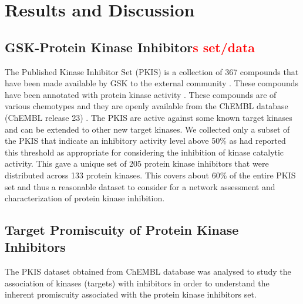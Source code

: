 \documentclass[a4paper, 11pt]{article}
\newcommand{\redinsert}[1]{\textcolor{red}{#1}} %
\begin{document}
\section*{Results and Discussion}
\subsection*{GSK-Protein Kinase Inhibitor\redinsert{s set/data}}
The Published Kinase Inhibitor Set (PKIS) is a collection of 367 compounds that have been made available by GSK to the external community \cite{dranchak2013profile, knapp2013public}. These compounds have been annotated with protein kinase  activity \cite{knapp2013public}. These compounds are of various chemotypes and they are openly available from the ChEMBL database (ChEMBL release 23) \cite{gaulton2016chembl}. The PKIS are active against some known target kinases and can be extended to other new target kinases. We collected only a subset of the PKIS that indicate an inhibitory activity level above 50\% as \cite{dranchak2013profile,  anastassiadis2011comprehensive} had reported this threshold as appropriate for considering the inhibition of kinase catalytic activity. This gave a unique set of 205 protein kinase inhibitors that were distributed across 133 protein kinases. This covers about 60\% of the entire PKIS set and thus a reasonable dataset to consider for a network assessment and characterization of protein kinase inhibition.

\subsection*{Target Promiscuity of Protein Kinase Inhibitors}
The PKIS dataset obtained from ChEMBL database was analysed to study the association of kinases (targets) with inhibitors in order to understand the inherent promiscuity associated with the protein kinase inhibitors set. 
\end{document}
